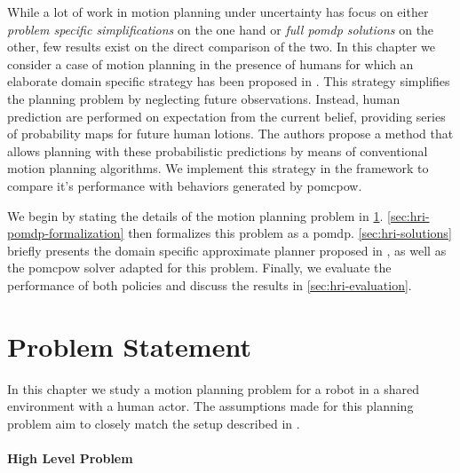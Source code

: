 While a lot of work in motion planning under uncertainty has focus on either
\emph{problem specific simplifications} on the one hand or \emph{full
\ac{pomdp} solutions} on the other, few results exist on the direct comparison
of the two. In this chapter we consider a case of motion planning in the
presence of humans for which an elaborate domain specific strategy has been
proposed in \cite{fisac2018probabilistically}. This strategy simplifies the
planning problem by neglecting future observations. Instead, human prediction
are performed on expectation from the current belief, providing series of
probability maps for future human lotions. The authors propose a method that
allows planning with these probabilistic predictions by means of conventional
motion planning algorithms. We implement this strategy in the \pomdpsjl
framework to compare it's performance with behaviors generated by
\ac{pomcpow}.

We begin by stating the details of the motion planning problem in
\cref{sec:hri-problem-statement}. \cref{sec:hri-pomdp-formalization} then
formalizes this problem as a \ac{pomdp}. \cref{sec:hri-solutions} briefly
presents the domain specific approximate planner proposed in
\cite{fisac2018probabilistically}, as well as the \ac{pomcpow} solver adapted
for this problem. Finally, we evaluate the performance of both policies and
discuss the results in \cref{sec:hri-evaluation}.

\section{Problem Statement}\label{sec:hri-problem-statement}

In this chapter we study a motion planning problem for a robot in a shared
environment with a human actor. The assumptions made for this planning problem
aim to closely match the setup described in \cite{fisac2018probabilistically}.


\paragraph{High Level Problem}

